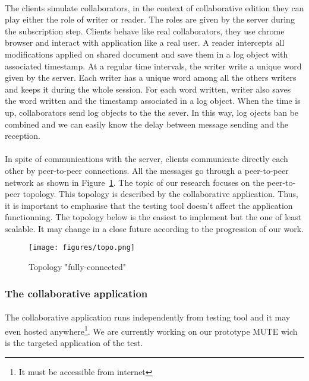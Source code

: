\documentclass[twoside,twocolumn]{article}
\begin{document}
\paragraph{}
The clients simulate collaborators, in the context of collaborative edition they can play either the role of writer or reader.
The roles are given by the server during the subscription step. Clients behave like real collaborators, they use chrome browser and
interact with application like a real user. A reader intercepts all modifications applied on shared document and save them in a log object
with associated timestamp. At a regular time intervals, the writer write a unique word given by the server. Each writer has a unique word among all
the others writers and keeps it during the whole session. For each word written, writer also saves the word written and the timestamp associated in a
log object. When the time is up, collaborators send log objects to the the sever. In this way, log ojects ban be combined and we can easily know the delay
between message sending and the reception.
\paragraph{}
In spite of communications with the server, clients communicate directly each other by peer-to-peer connections. All the messages go through a
peer-to-peer network as shown in Figure~\ref{fig:topo}. The topic of our research focuses on the peer-to-peer topology. This topology is described by
the collaborative application. Thus, it is important to emphasise that the testing tool doesn't affect the application functionning. The topology below
is the easiest to implement but the one of least scalable. It may change in a close future according to the progression of our work.

\begin{figure}[h!]
  \centering
  \texttt{[image: figures/topo.png]}
  \caption{Topology "fully-connected"}
  \label{fig:topo}
\end{figure}

\subsubsection{The collaborative application}
\paragraph{}
The collaborative application runs independently from testing tool and it may even hosted anywhere\footnote{It must be accessible from internet}.
We are currently working on our prototype MUTE wich is the targeted application of the test.
\end{document}

